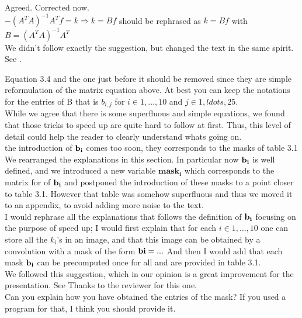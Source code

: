 \documentclass[a4paper,10pt]{report}
\begin{document}
\ans Agreed. Corrected now.\\


\que $- (A^TA)^{−1}A^T f=k \Rightarrow k=Bf$ should be rephrased as
$k=Bf$ with $B=(A^TA)^{−1}A^T$\\

\ans We didn't follow exactly the suggestion, but changed the text in the same spirit. See .

\que Equation 3.4 and the one just before it should be removed since they are
simple reformulation of the matrix equation above. At best you can keep the
notations for the entries of B that is $b_{i,j}$ for $i\in {1,\ldots,10}$ and
$j \in {1,ldots,25}$.\\

\ans While we agree that there is some superfluous and simple equations, we found that those tricks to speed up are quite hard to follow at first. Thus, this level of detail could help the reader to clearly understand whats going on.\\

\que the introduction of $\bf{b_i}$ comes too soon, they corresponds to the masks of table 3.1\\

\ans We rearranged the explanations in this section. In particular now $\bf{b_i}$ is well defined, and we introduced a new variable $\mathbf{mask_i}$ which corresponds to the matrix for of $\bf{b_i}$ and postponed the introduction of these masks to a point closer to table 3.1. However that table was somehow superfluous and thus we moved it to an appendix, to avoid adding more noise to the text.\\

\que  I would rephrase all the explanations that follows the definition of $\bf{b_i}$
focusing on the purpose of speed up; I would first explain that for each
$i\in {1,\ldots,10}$ one can store all the $k_i$'s in an image, and that this
image can be obtained by a convolution with a mask of the form $\bf{bi}=...$
And then I would add that each mask $\bf{b_i}$ can be precomputed once for all and are provided in table 3.1.\\

\ans We followed this suggestion, which in our opinion is a great improvement for the presentation. See  Thanks to the reviewer for this one. \\

\que Can you explain how you have obtained the entries of the mask? If you used a program for that, I think you should provide it.\\
\end{document}
